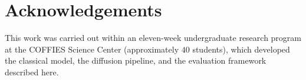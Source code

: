 \documentclass[twocolumn]{aastex631}
\begin{document}
\section*{Acknowledgements}

This work was carried out within an eleven-week undergraduate research program at
the COFFIES Science Center (approximately $40$ students), which developed the
classical model, the diffusion pipeline, and the evaluation framework described
here. %

\facility{}

\end{document}
